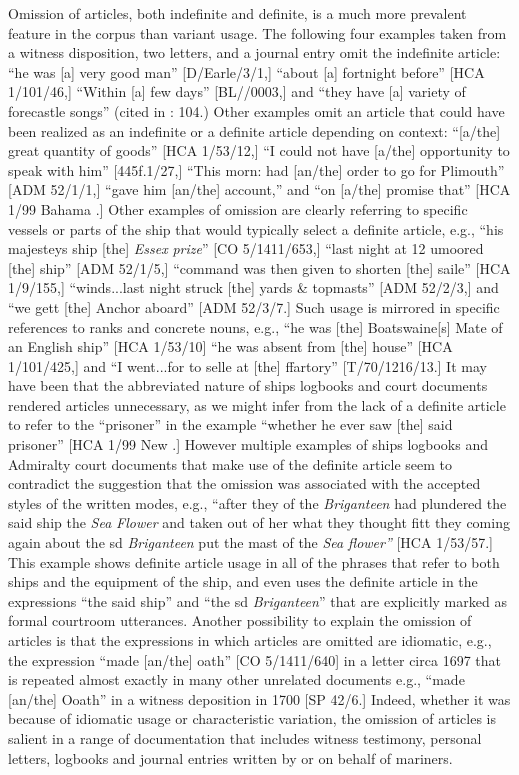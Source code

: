   Omission of articles, both indefinite and definite, is a much more prevalent feature in the corpus than variant usage. The following four examples taken from a witness disposition, two letters, and a journal entry omit the indefinite article: “he was [a] very good man” [D/Earle/3/1,] “about [a] fortnight before” [HCA 1/101/46,] “Within [a] few days” [BL/\citealt{Egerton2395}/0003,] and “they have [a] variety of forecastle songs” (cited in \citealt{Palmer1986}: 104.) Other examples omit an article that could have been realized as an indefinite or a definite article depending on context: “[a/the] great quantity of goods” [HCA 1/53/12,] “I could not have [a/the] opportunity to speak with him” [445f.1/27,] “This morn: had [an/the] order to go for Plimouth” [ADM 52/1/1,] “gave him [an/the] account,” and “on [a/the] promise that” [HCA 1/99 Bahama \citealt{Islands1722}.] Other examples of omission are clearly referring to specific vessels or parts of the ship that would typically select a definite article, e.g., “his majesteys ship [the] \textit{Essex} \textit{prize}” [CO 5/1411/653,] “last night at 12 umoored [the] ship” [ADM 52/1/5,] “command was then given to shorten [the] saile” [HCA 1/9/155,] “winds...last night struck [the] yards \& topmasts” [ADM 52/2/3,] and “we gett [the] Anchor aboard” [ADM 52/3/7.] Such usage is mirrored in specific references to ranks and concrete nouns, e.g., “he was [the] Boatswaine[s] Mate of an English ship” [HCA 1/53/10] “he was absent from [the] house” [HCA 1/101/425,] and “I went...for to selle at [the] ffartory” [T/70/1216/13.] It may have been that the abbreviated nature of ships logbooks and court documents rendered articles unnecessary, as we might infer from the lack of a definite article to refer to the “prisoner” in the example “whether he ever saw [the] said prisoner” [HCA 1/99 New \citealt{Providence1722}.] However multiple examples of ships logbooks and Admiralty court documents that make use of the definite article seem to contradict the suggestion that the omission was associated with the accepted styles of the written modes, e.g., “after they of the \textit{Briganteen} had plundered the said ship the \textit{Sea} \textit{Flower} and taken out of her what they thought fitt they coming again about the sd \textit{Briganteen} put the mast of the \textit{Sea} \textit{flower”} [HCA 1/53/57.] This example shows definite article usage in all of the phrases that refer to both ships and the equipment of the ship, and even uses the definite article in the expressions “the said ship” and “the sd \textit{Briganteen}” that are explicitly marked as formal courtroom utterances. Another possibility to explain the omission of articles is that the expressions in which articles are omitted are idiomatic, e.g., the expression “made [an/the] oath” [CO 5/1411/640] in a letter circa 1697 that is repeated almost exactly in many other unrelated documents e.g., “made [an/the] Ooath” in a witness deposition in 1700 [SP 42/6.] Indeed, whether it was because of idiomatic usage or characteristic variation, the omission of articles is salient in a range of documentation that includes witness testimony, personal letters, logbooks and journal entries written by or on behalf of mariners. 


